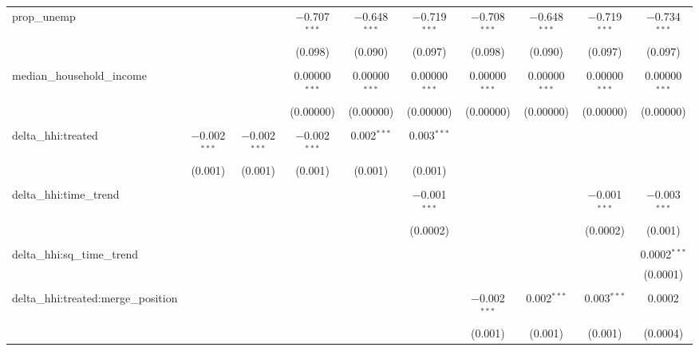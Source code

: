 \begin{table}[H]
{\begin{tabular}{@{\extracolsep{5pt}}lccccccccc}
  prop\_unemp &  &  & $-$0.707$^{***}$ & $-$0.648$^{***}$ & $-$0.719$^{***}$ & $-$0.708$^{***}$ & $-$0.648$^{***}$ & $-$0.719$^{***}$ & $-$0.734$^{***}$ \\  

   &  &  & (0.098) & (0.090) & (0.097) & (0.098) & (0.090) & (0.097) & (0.097) \\  

   & & & & & & & & & \\  

  median\_household\_income &  &  & 0.00000$^{***}$ & 0.00000$^{***}$ & 0.00000$^{***}$ & 0.00000$^{***}$ & 0.00000$^{***}$ & 0.00000$^{***}$ & 0.00000$^{***}$ \\  

   &  &  & (0.00000) & (0.00000) & (0.00000) & (0.00000) & (0.00000) & (0.00000) & (0.00000) \\  

   & & & & & & & & & \\  

  delta\_hhi:treated & $-$0.002$^{***}$ & $-$0.002$^{***}$ & $-$0.002$^{***}$ & 0.002$^{***}$ & 0.003$^{***}$ &  &  &  &  \\  

   & (0.001) & (0.001) & (0.001) & (0.001) & (0.001) &  &  &  &  \\  

   & & & & & & & & & \\  

  delta\_hhi:time\_trend &  &  &  &  & $-$0.001$^{***}$ &  &  & $-$0.001$^{***}$ & $-$0.003$^{***}$ \\  

   &  &  &  &  & (0.0002) &  &  & (0.0002) & (0.001) \\  

   & & & & & & & & & \\  

  delta\_hhi:sq\_time\_trend &  &  &  &  &  &  &  &  & 0.0002$^{***}$ \\  

   &  &  &  &  &  &  &  &  & (0.0001) \\  

   & & & & & & & & & \\  

  delta\_hhi:treated:merge\_position &  &  &  &  &  & $-$0.002$^{***}$ & 0.002$^{***}$ & 0.003$^{***}$ & 0.0002 \\  

   &  &  &  &  &  & (0.001) & (0.001) & (0.001) & (0.0004) \\  


\end{tabular}}
\end{table}
